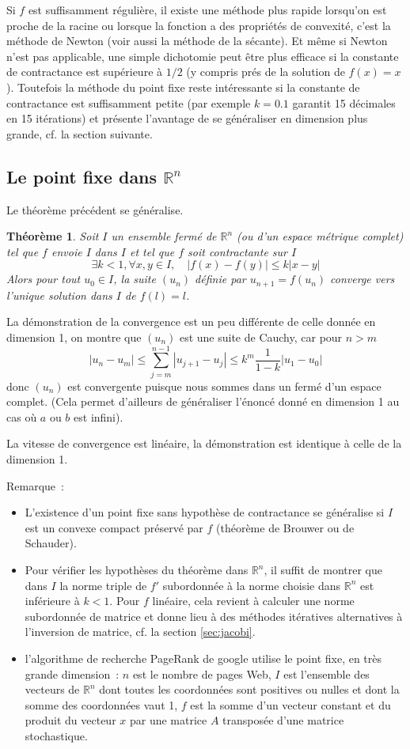 \documentclass[a4paper,11pt]{article}
\newtheorem{thm}{Théorème}
\newcommand{\R}{{\mathbb{R}}}
\begin{document}
\begin{giacjshere}
Si $f$ est suffisamment r\'eguli\`ere,
il existe une méthode plus rapide lorsqu'on est proche de la racine ou lorsque
la fonction a des propriétés de convexité, c'est la méthode de Newton
(voir aussi la m\'ethode de la s\'ecante).
Et m\^eme si Newton n'est pas applicable, une simple dichotomie
peut \^etre plus efficace si la constante de contractance est 
sup\'erieure \`a $1/2$ (y compris pr\'es de la solution de $f(x)=x$).
Toutefois la m\'ethode du point fixe reste int\'eressante si la
constante de contractance est suffisamment petite (par exemple $k=0.1$
garantit 15 d\'ecimales en 15 it\'erations) et pr\'esente l'avantage
de se g\'en\'eraliser en dimension plus grande, cf. la section suivante.

\subsection{Le point fixe dans $\R^n$}
Le th\'eor\`eme pr\'ec\'edent se g\'en\'eralise. 
\begin{thm}
Soit $I$ un ensemble
ferm\'e de $\R^n$ (ou d'un espace m\'etrique complet) tel que $f$ 
envoie $I$ dans $I$ et tel que $f$ soit contractante sur $I$
$$ \exists k<1, \forall x,y \in I, \quad |f(x)-f(y)| \leq k |x-y|$$
Alors pour tout $u_0 \in I$, la suite $(u_n)$ d\'efinie par
$u_{n+1}=f(u_n)$ converge vers l'unique solution dans $I$ de $f(l)=l$.
\end{thm}
La d\'emonstration de la convergence est un peu diff\'erente de celle 
donn\'ee en
dimension 1, on montre que $(u_n)$ est une suite de Cauchy, car pour $n>m$
$$ |u_n-u_m| \leq \sum_{j=m}^{n-1}|u_{j+1}-u_j | 
\leq k^m \frac{1}{1-k} |u_1-u_0| $$
donc $(u_n)$ est convergente puisque nous sommes dans un ferm\'e 
d'un espace complet. (Cela permet d'ailleurs de g\'en\'eraliser 
l'\'enonc\'e donn\'e en dimension 1 au cas o\`u $a$ ou $b$ est infini).

La vitesse de convergence est lin\'eaire, la d\'emonstration est
identique \`a celle de la dimension 1.

Remarque~: 
\begin{itemize}
\item L'existence d'un point fixe sans hypoth\`ese de contractance
se g\'en\'eralise si $I$ est un convexe compact pr\'eserv\'e
par $f$ (th\'eor\`eme
de Brouwer ou de Schauder).
\item Pour v\'erifier les hypoth\`eses du th\'eor\`eme dans
$\R^n$, il suffit de montrer que dans $I$ la norme triple de $f'$
subordonn\'ee \`a la norme choisie dans $\R^n$ est inf\'erieure
\`a $k<1$. Pour $f$ lin\'eaire,
cela revient \`a calculer une norme subordonn\'ee de matrice
et donne lieu \`a des m\'ethodes it\'eratives alternatives \`a
l'inversion de matrice, cf. la section \ref{sec:jacobi}.
\item l'algorithme de recherche
PageRank de google utilise le point fixe, en tr\`es grande dimension~:
$n$ est le nombre de pages Web, $I$ est l'ensemble des vecteurs
de $\R^n$ dont toutes les coordonn\'ees sont positives ou nulles et
dont la somme des coordonn\'ees vaut 1, $f$ est la somme d'un vecteur
constant et du produit du vecteur $x$ par une matrice $A$ transpos\'ee
d'une matrice stochastique.
\end{itemize}


\end{giacjshere}
\end{document}
